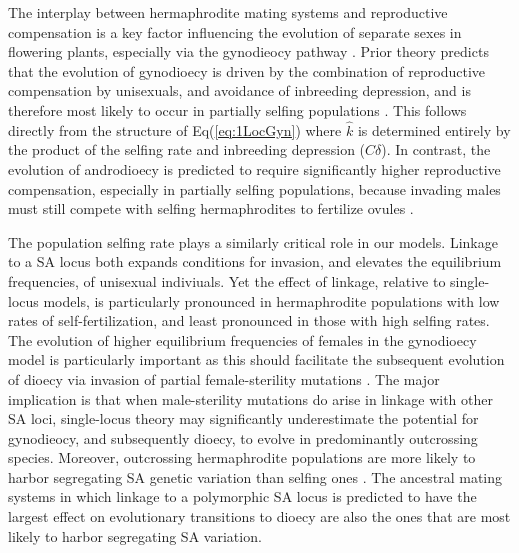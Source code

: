 \documentclass[9pt,twocolumn,twoside,lineno]{gsajnl}
\begin{document}
The interplay between hermaphrodite mating systems and reproductive compensation is a key factor influencing the evolution of separate sexes in flowering plants, especially via the gynodieocy pathway \citep{Darwin1877,Charlesworth1978a}. Prior theory predicts that the evolution of gynodioecy is driven by the combination of reproductive compensation by unisexuals, and avoidance of inbreeding depression, and is therefore most likely to occur in partially selfing populations \citep{Lewis1942,Lloyd1975,Charlesworth1978a,KaferPannell2017}. This follows directly from the structure of Eq(\ref{eq:1LocGyn}) where $\hat{k}$ is determined entirely by the product of the selfing rate and inbreeding depression ($C \delta$). In contrast, the evolution of androdioecy is predicted to require significantly higher reproductive compensation, especially in partially selfing populations, because invading males must still compete with selfing hermaphrodites to fertilize ovules \citep{Charlesworth1978b,KaferPannell2017}. 

The population selfing rate plays a similarly critical role in our models. Linkage to a SA locus both expands conditions for invasion, and elevates the equilibrium frequencies, of unisexual indiviuals. Yet the effect of linkage, relative to single-locus models, is particularly pronounced in hermaphrodite populations with low rates of self-fertilization, and least pronounced in those with high selfing rates. The evolution of higher equilibrium frequencies of females in the gynodioecy model is particularly important as this should facilitate the subsequent evolution of dioecy via invasion of partial female-sterility mutations \citep{Charlesworth1978a,Charlesworth1978b,Charlesworth1999,Charlesworth2006}. The major implication is that when male-sterility mutations do arise in linkage with other SA loci, single-locus theory may significantly underestimate the potential for gynodieocy, and subsequently dioecy, to evolve in predominantly outcrossing species. Moreover, outcrossing hermaphrodite populations are more likely to harbor segregating SA genetic variation than selfing ones \citep{JordanConnallon2014,Olito2016}. The ancestral mating systems in which linkage to a polymorphic SA locus is predicted to have the largest effect on evolutionary transitions to dioecy are also the ones that are most likely to harbor segregating SA variation. 
\end{document}
